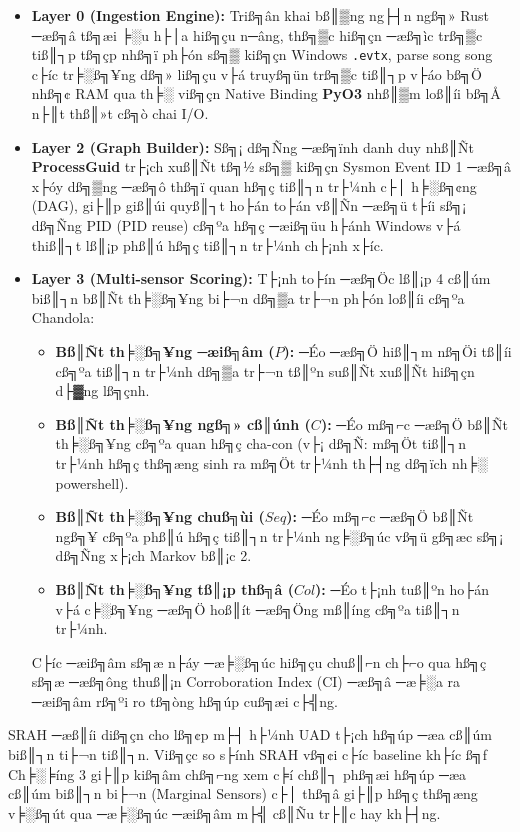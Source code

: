 ﻿\documentclass[../main.tex]{subfiles}
\begin{document}
\begin{itemize}
    \item \textbf{Layer 0 (Ingestion Engine):} Triß╗ân khai bß║▒ng ng├┤n ngß╗» Rust ─æß╗â tß╗æi ╞░u h├│a hiß╗çu n─âng, thß╗▒c hiß╗çn ─æß╗ìc trß╗▒c tiß║┐p tß╗çp nhß╗ï ph├ón sß╗▒ kiß╗çn Windows \texttt{.evtx}, parse song song c├íc tr╞░ß╗¥ng dß╗» liß╗çu v├á truyß╗ün trß╗▒c tiß║┐p v├áo bß╗Ö nhß╗¢ RAM qua th╞░ viß╗çn Native Binding \textbf{PyO3} nhß║▒m loß║íi bß╗Å n├║t thß║»t cß╗ò chai I/O.
    \item \textbf{Layer 2 (Graph Builder):} Sß╗¡ dß╗Ñng ─æß╗ïnh danh duy nhß║Ñt \textbf{ProcessGuid} tr├¡ch xuß║Ñt tß╗½ sß╗▒ kiß╗çn Sysmon Event ID 1 ─æß╗â x├óy dß╗▒ng ─æß╗ô thß╗ï quan hß╗ç tiß║┐n tr├¼nh c├│ h╞░ß╗¢ng (DAG), gi├║p giß║úi quyß║┐t ho├án to├án vß║Ñn ─æß╗ü t├íi sß╗¡ dß╗Ñng PID (PID reuse) cß╗ºa hß╗ç ─æiß╗üu h├ánh Windows v├á thiß║┐t lß║¡p phß║ú hß╗ç tiß║┐n tr├¼nh ch├¡nh x├íc.
    \item \textbf{Layer 3 (Multi-sensor Scoring):} T├¡nh to├ín ─æß╗Öc lß║¡p 4 cß║úm biß║┐n bß║Ñt th╞░ß╗¥ng bi├¬n dß╗▒a tr├¬n ph├ón loß║íi cß╗ºa Chandola:
    \begin{itemize}
        \item \textbf{Bß║Ñt th╞░ß╗¥ng ─æiß╗âm ($P$):} ─Éo ─æß╗Ö hiß║┐m nß╗Öi tß║íi cß╗ºa tiß║┐n tr├¼nh dß╗▒a tr├¬n tß║ºn suß║Ñt xuß║Ñt hiß╗çn d├▓ng lß╗çnh.
        \item \textbf{Bß║Ñt th╞░ß╗¥ng ngß╗» cß║únh ($C$):} ─Éo mß╗⌐c ─æß╗Ö bß║Ñt th╞░ß╗¥ng cß╗ºa quan hß╗ç cha-con (v├¡ dß╗Ñ: mß╗Öt tiß║┐n tr├¼nh hß╗ç thß╗æng sinh ra mß╗Öt tr├¼nh th├┤ng dß╗ïch nh╞░ powershell).
        \item \textbf{Bß║Ñt th╞░ß╗¥ng chuß╗ùi ($Seq$):} ─Éo mß╗⌐c ─æß╗Ö bß║Ñt ngß╗¥ cß╗ºa phß║ú hß╗ç tiß║┐n tr├¼nh ng╞░ß╗úc vß╗ü gß╗æc sß╗¡ dß╗Ñng x├¡ch Markov bß║¡c 2.
        \item \textbf{Bß║Ñt th╞░ß╗¥ng tß║¡p thß╗â ($Col$):} ─Éo t├¡nh tuß║ºn ho├án v├á c╞░ß╗¥ng ─æß╗Ö hoß║ít ─æß╗Öng mß║íng cß╗ºa tiß║┐n tr├¼nh.
    \end{itemize}
    C├íc ─æiß╗âm sß╗æ n├áy ─æ╞░ß╗úc hiß╗çu chuß║⌐n ch├⌐o qua hß╗ç sß╗æ ─æß╗ông thuß║¡n Corroboration Index (CI) ─æß╗â ─æ╞░a ra ─æiß╗âm rß╗ºi ro tß╗òng hß╗úp cuß╗æi c├╣ng.
\end{itemize}

SRAH ─æß║íi diß╗çn cho lß╗¢p m├┤ h├¼nh UAD t├¡ch hß╗úp ─æa cß║úm biß║┐n ti├¬n tiß║┐n. Viß╗çc so s├ính SRAH vß╗¢i c├íc baseline kh├íc ß╗ƒ Ch╞░╞íng 3 gi├║p kiß╗âm chß╗⌐ng xem c╞í chß║┐ phß╗æi hß╗úp ─æa cß║úm biß║┐n bi├¬n (Marginal Sensors) c├│ thß╗â gi├║p hß╗ç thß╗æng v╞░ß╗út qua ─æ╞░ß╗úc ─æiß╗âm m├╣ cß║Ñu tr├║c hay kh├┤ng.
\end{document}
